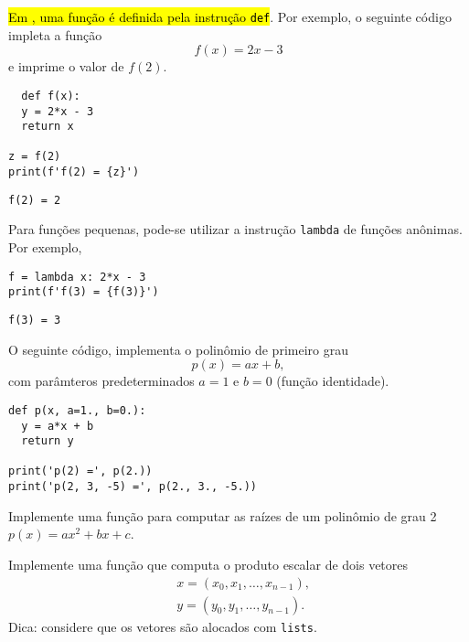 \documentclass[12pt]{article}
\begin{document}
\hl{Em {\python}, uma função é definida pela instrução \texttt{def}}. Por exemplo, o seguinte código impleta a função
\begin{equation}
  f(x) = 2x - 3
\end{equation}
e imprime o valor de $f(2)$.

\begin{lstlisting}
  def f(x):
  y = 2*x - 3
  return x

z = f(2)
print(f'f(2) = {z}')
\end{lstlisting}

\begin{verbatim}
f(2) = 2
\end{verbatim}

\begin{obs}
  Para funções pequenas, pode-se utilizar a instrução \texttt{lambda} de funções anônimas. Por exemplo,

\begin{lstlisting}
f = lambda x: 2*x - 3
print(f'f(3) = {f(3)}')
\end{lstlisting}

\begin{verbatim}
f(3) = 3
\end{verbatim}

\end{obs}

\begin{ex}
  O seguinte código, implementa o polinômio de primeiro grau
  \begin{equation}
    p(x) = ax + b,
  \end{equation}
  com parâmteros predeterminados $a=1$ e $b=0$ (função identidade).

\begin{lstlisting}
def p(x, a=1., b=0.):
  y = a*x + b
  return y

print('p(2) =', p(2.))
print('p(2, 3, -5) =', p(2., 3., -5.))
\end{lstlisting}

\end{ex}

\begin{exr}
  Implemente uma função para computar as raízes de um polinômio de grau 2 $p(x) = ax^2 + bx + c$.
\end{exr}

\begin{exr}
  Implemente uma função que computa o produto escalar de dois vetores
  \begin{align}
    &x = (x_0, x_1, \ldots, x_{n-1}),\\
    &y = (y_0, y_1, \ldots, y_{n-1}).
  \end{align}
  Dica: considere que os vetores são alocados com \texttt{lists}.
\end{exr}
\end{document}
